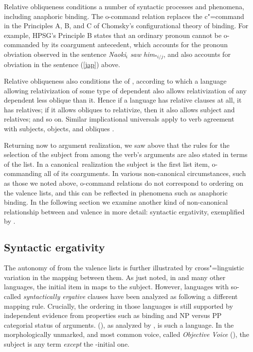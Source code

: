 \documentclass[output=paper
 	        ,biblatex
                ,babelshorthands
                ,newtxmath
                ,draftmode
                ,colorlinks, citecolor=brown
]{langscibook}
\begin{document}
Relative obliqueness conditions a number of syntactic processes and phenomena, including anaphoric
binding.  The o-command relation replaces the c"=command in the Principles A, B, and C of Chomsky's
\citeyearpar{Chomsky:1981} configurational theory of binding.  For example, HPSG's Principle B
states that an ordinary pronoun cannot be o-commanded by its coargument antecedent, which accounts
for the pronoun obviation observed in the  sentence \textit{Naoki$_i$ saw
  him$_{*i/j}$}, and also accounts for obviation in the  sentence (\ref{jap}) above.

Relative obliqueness also conditions the  of
\citet{KeenanandComrie1977}, according to which a language allowing relativization of some type of
dependent also allows relativization of any dependent less oblique than it.  Hence if a language has relative
clauses at all, it has  relatives; if it allows obliques to relativize, then it also allows
subject and  relatives; and so on. Similar implicational universals apply to verb agreement
with subjects, objects, and obliques \citep{greenberg:1966}. 

Returning now to argument realization, we saw above that the rules for the selection of the subject
from among the verb's arguments are also stated in terms of the \argst list.  In a canonical\
realization the subject is the first list item, o-commanding all of its coarguments.
In various non-canonical circumstances, such as those we noted above, o-command relations do not
correspond to ordering on the valence lists, and this can be reflected in phenomena such as
anaphoric binding.  In the following section we examine another kind of non-canonical relationship
between \argst and valence in more detail: syntactic ergativity, exemplified by \ili{Balinese}.

\subsection{Syntactic ergativity}
\label{ergativity}\label{arg-st-sec-ergativity}

The autonomy of \argst from the valence lists is further illustrated by
cross"=linguistic variation in the mapping between them.  As just noted, in \ili{English} and many
other languages, the initial item in \argst maps to the subject.  However, languages with so-called
\emph{syntactically ergative} clauses have been analyzed as following a different mapping rule.
Crucially, the \argst ordering in those languages is still supported by independent evidence from
properties such as binding and NP versus PP categorial status of arguments.  \ili{Balinese}
(\ili{Austronesian}), as analyzed by \citet{Wechsler+Arka:1998}, is such a language.  In the
morphologically unmarked, and most common voice, called \emph{Objective Voice}
(\attrib{ov}), the subject is any term \textit{except} the \argst-initial one.
\end{document}

